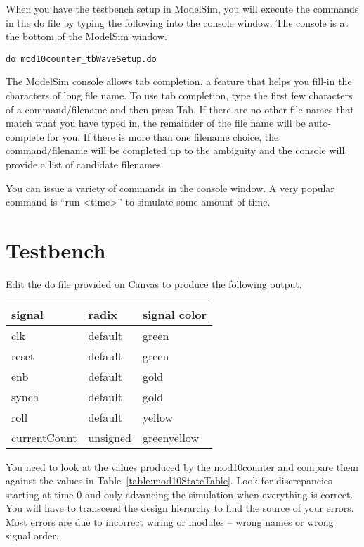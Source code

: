 When you have the testbench setup in ModelSim, you will
execute the commands in the do file by typing the
following into the console window.  The console is at the
bottom of the ModelSim window.

\begin{verbatim}
do mod10counter_tbWaveSetup.do
\end{verbatim}

The ModelSim console allows tab completion, a feature that helps you
fill-in the characters of long file name. To use tab completion, type
the first few characters of a command/filename and then press Tab. If
there are no other file names that match what you have typed in, the
remainder of the file name will be auto-complete for you. If there is
more than one filename choice, the command/filename will be completed up
to the ambiguity and the console will provide a list of candidate
filenames.

You can issue a variety of commands in the console window.   A very popular
command is ``run \textless time\textgreater'' to simulate some amount
of time.

\section{Testbench}
Edit the do file provided on Canvas to produce the following output.
\hypertarget{link:mod10DoFile}{}{}

\begin{tabular}{p{3cm}p{3cm}p{3cm}}
    signal & radix & signal color \\ \hline
    clk         & default         & green  \\
    reset     & default         & green  \\
    enb         & default         & gold  \\
    synch     & default         & gold  \\
    roll         & default         & yellow  \\
    currentCount     & unsigned & greenyellow  \\
\end{tabular}

You need to look at the values produced by the mod10counter and compare
them against the values in Table~\ref{table:mod10StateTable}. Look for discrepancies
starting at time 0 and only advancing the simulation when everything is
correct. You will have to transcend the design hierarchy to find the
source of your errors. Most errors are due to incorrect wiring or
modules -- wrong names or wrong signal order.

